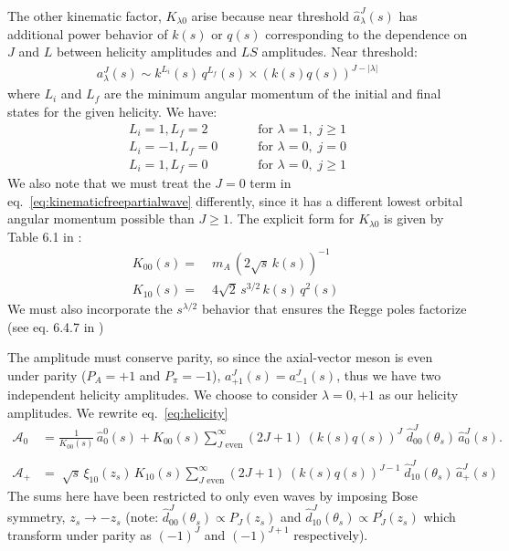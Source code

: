 \documentclass[10pt, aps,prd,amsmath,amssymb,superscriptaddress,onecolumn,
nofootinbib,showpacs,preprintnumbers]{revtex4-1}
\begin{document}
The other kinematic factor, \(K_{\lambda0}\) arise  because near threshold \(\hat{a}_\lambda^J(s)\) has additional power behavior of \(k(s)\) or \(q(s)\) corresponding to the dependence on \(J\) and \(L\) between helicity amplitudes and \(LS\) amplitudes. Near threshold:
  \begin{gather}
    a^J_\lambda(s) \sim k^{L_i}(s) \, q^{L_f}(s) \times (k(s)q(s))^{J- |\lambda|}
  \end{gather}
where \(L_i\) and \(L_f\) are the minimum angular momentum of the initial and final states for the given helicity. We have:
  \begin{align}
      L_i = 1 , L_f = 2& \qquad  \text{ for } \lambda = 1, \; j \geq 1 \nonumber \\
      L_i = -1, L_f = 0 &\qquad  \text{ for } \lambda = 0, \; j = 0 \nonumber \\
      L_i = 1, L_f = 0 &\qquad  \text{ for } \lambda = 0, \;  j  \geq 1 \nonumber
  \end{align}
We also note that we must treat the \(J=0\) term in eq.~\ref{eq:kinematicfreepartialwave} differently, since it has a different lowest orbital angular momentum possible than \(J\geq 1\). The explicit form for \(K_{\lambda0}\) is given by Table 6.1 in \cite{Collins}:
  \begin{align}
    \label{eq:k-factor}
    K_{00 }(s) =& \; m_A \, ( 2\sqrt{s} \, k(s))^{-1}\\ \nonumber
    K_{10}(s) =& \; 4 \sqrt{2} \,  s^{3/2} \, k(s) \, q^2(s)  \;
  \end{align}
We must also incorporate the \(s^{\lambda/2}\) behavior that ensures the Regge poles factorize (see eq. 6.4.7 in \cite{Collins})

The amplitude must conserve parity, so since the axial-vector meson is even under parity (\( P_A = +1\) and \(P_\pi = -1\)), \(a_{+1}^J(s) = a_{-1}^J(s)\), thus we have two independent helicity amplitudes. We choose to consider \(\lambda = 0, +1\) as our helicity amplitudes.
We rewrite eq.~\ref{eq:helicity}
  \begin{align}
    \label{eq:model-helicity}
    \mathcal{A}_0 &= \frac{1}{K_{00}(s)} \, \hat{a}^0_0(s) + K_{00}(s) \sum_{J \text{ even}}^\infty (2J+1) \, (k(s)q(s))^J \; \hat{d}_{00}^J(\theta_s) \, \hat{a}^J_0(s). \\
    \nonumber \\
    \mathcal{A}_+ &= \; \sqrt{s} \, \xi_{10}(z_s) \, K_{10}(s) \sum_{J \text{ even}}^\infty (2J+1) \ (k(s)q(s))^{J-1} \;  \hat{d}_{10}^J(\theta_s) \, \hat{a}^J_+(s)
  \end{align}
The sums here have been restricted to only even waves by imposing Bose symmetry, \( z_s \to - z_s\) (note: \(\hat{d}^J_{00}(\theta_s) \propto P_J(z_s)\) and \(\hat{d}^J_{10}(\theta_s) \propto P^\prime_J(z_s)\) which transform under parity as \((-1)^J\) and \((-1)^{J+1}\) respectively).
\end{document}
